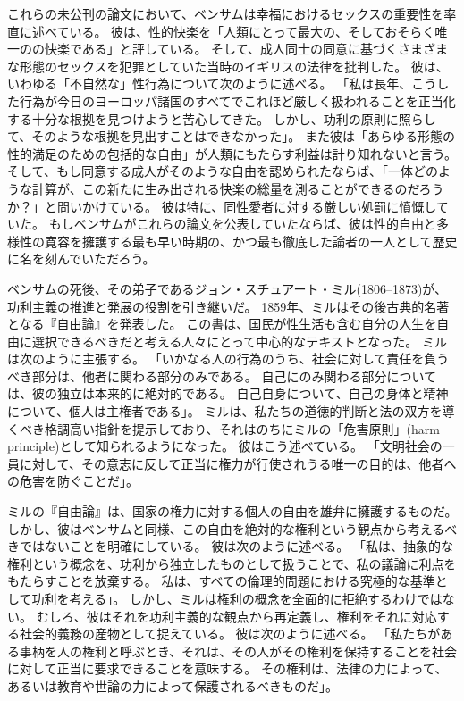 \documentclass[paper=a4,book,openany]{jlreq} \usepackage{mystyle}
\begin{document}
これらの未公刊の論文において、ベンサムは幸福におけるセックスの重要性を率直に述べている。
彼は、性的快楽を「人類にとって最大の、そしておそらく唯一のの快楽である」と評している。
そして、成人同士の同意に基づくさまざまな形態のセックスを犯罪としていた当時のイギリスの法律を批判した。
彼は、いわゆる「不自然な」性行為について次のように述べる。
「私は長年、こうした行為が今日のヨーロッパ諸国のすべてでこれほど厳しく扱われることを正当化する十分な根拠を見つけようと苦心してきた。
しかし、功利の原則に照らして、そのような根拠を見出すことはできなかった」。
また彼は「あらゆる形態の性的満足のための包括的な自由」が人類にもたらす利益は計り知れないと言う。
そして、もし同意する成人がそのような自由を認められたならば、「一体どのような計算が、この新たに生み出される快楽の総量を測ることができるのだろうか？」と問いかけている。
彼は特に、同性愛者に対する厳しい処罰に憤慨していた。
もしベンサムがこれらの論文を公表していたならば、彼は性的自由と多様性の寛容を擁護する最も早い時期の、かつ最も徹底した論者の一人として歴史に名を刻んでいただろう。

ベンサムの死後、その弟子であるジョン・スチュアート・ミル(1806--1873)が、功利主義の推進と発展の役割を引き継いだ。
1859年、ミルはその後古典的名著となる『自由論』を発表した。
この書は、国民が性生活も含む自分の人生を自由に選択できるべきだと考える人々にとって中心的なテキストとなった。
ミルは次のように主張する。
「いかなる人の行為のうち、社会に対して責任を負うべき部分は、他者に関わる部分のみである。
自己にのみ関わる部分については、彼の独立は本来的に絶対的である。
自己自身について、自己の身体と精神について、個人は主権者である」\citep[p.13]{mill15:_liber_utilit_other_essay}。
ミルは、私たちの道徳的判断と法の双方を導くべき格調高い指針を提示しており、それはのちにミルの「危害原則」(harm principle)として知られるようになった。
彼はこう述べている。
「文明社会の一員に対して、その意志に反して正当に権力が行使されうる唯一の目的は、他者への危害を防ぐことだ」\citep[p.13]{mill15:_liber_utilit_other_essay}。

ミルの『自由論』は、国家の権力に対する個人の自由を雄弁に擁護するものだ。
しかし、彼はベンサムと同様、この自由を絶対的な権利という観点から考えるべきではないことを明確にしている。
彼は次のように述べる。
「私は、抽象的な権利という概念を、功利から独立したものとして扱うことで、私の議論に利点をもたらすことを放棄する。
私は、すべての倫理的問題における究極的な基準として功利を考える」\citep[p.14]{mill15:_liber_utilit_other_essay}。
しかし、ミルは権利の概念を全面的に拒絶するわけではない。
むしろ、彼はそれを功利主義的な観点から再定義し、権利をそれに対応する社会的義務の産物として捉えている。
彼は次のように述べる。
「私たちがある事柄を人の権利と呼ぶとき、それは、その人がその権利を保持することを社会に対して正当に要求できることを意味する。
その権利は、法律の力によって、あるいは教育や世論の力によって保護されるべきものだ」\citep[p.166]{mill15:_liber_utilit_other_essay}。
\end{document}
